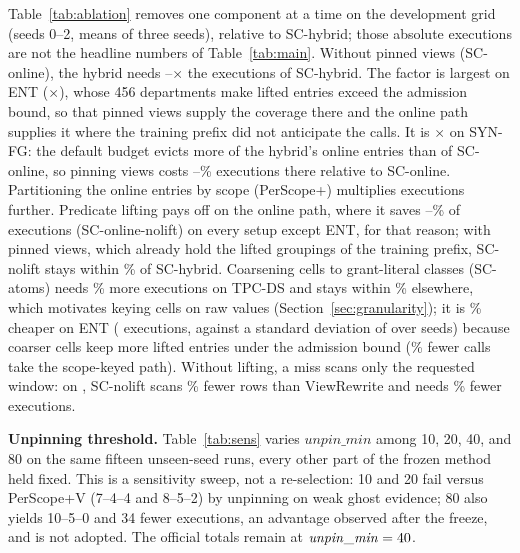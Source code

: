 \documentclass[sigconf, nonacm]{acmart}
\newcommand{\M}[1]{\textsf{#1}}
\begin{document}


Table~\ref{tab:ablation} removes one component at a time on the development grid (seeds 0--2, means of three seeds), relative to \M{SC-hybrid}; those absolute executions are not the headline numbers of Table~\ref{tab:main}. Without pinned views (\M{SC-online}), the hybrid needs \onlineFactorLo--\onlineFactorHi$\times$ the executions of \M{SC-hybrid}. The factor is largest on ENT (\onlineFactorEnt$\times$), whose 456 departments make lifted entries exceed the admission bound, so that pinned views supply the coverage there and the online path supplies it where the training prefix did not anticipate the calls. It is \onlineFactorLo$\times$ on SYN-FG: the default budget evicts more of the hybrid's online entries than of \M{SC-online}, so pinning views costs \synfgOnlineVsSCLo--\synfgOnlineVsSCHi\% executions there relative to \M{SC-online}. Partitioning the online entries by scope (\M{PerScope+}) multiplies executions further. Predicate lifting pays off on the online path, where it saves \onlineNoliftSaveLo--\onlineNoliftSaveHi\% of executions (\M{SC-online-nolift}) on every setup except ENT, for that reason; with pinned views, which already hold the lifted groupings of the training prefix, \M{SC-nolift} stays within \noliftAbsMax\% of \M{SC-hybrid}. Coarsening cells to grant-literal classes (\M{SC-atoms}) needs \atomsMeanWorse\% more executions on TPC-DS and stays within \atomsMeanSave\% elsewhere, which motivates keying cells on raw values (Section~\ref{sec:granularity}); it is \atomsMeanSave\% cheaper on ENT (\atomsEntExecDiff{} executions, against a standard deviation of \scEntExecSd{} over seeds) because coarser cells keep more lifted entries under the admission bound (\atomsEntFbRed\% fewer calls take the scope-keyed path). Without lifting, a miss scans only the requested window: on \rowsUnfSetup, \M{SC-nolift} scans \noliftRowsRedVR\% fewer rows than \M{ViewRewrite} and needs \noliftExecRedVR\% fewer executions.

\textbf{Unpinning threshold.} Table~\ref{tab:sens} varies $\mathit{unpin\_min}$ among 10, 20, 40, and 80 on the same fifteen unseen-seed runs, every other part of the frozen method held fixed. This is a sensitivity sweep, not a re-selection: 10 and 20 fail versus \M{PerScope+V} (7--4--4 and 8--5--2) by unpinning on weak ghost evidence; 80 also yields 10--5--0 and 34 fewer executions, an advantage observed after the freeze, and is not adopted. The official totals remain \freshOursTot{} at $\mathit{unpin\_min}=40{}$.
\end{document}
